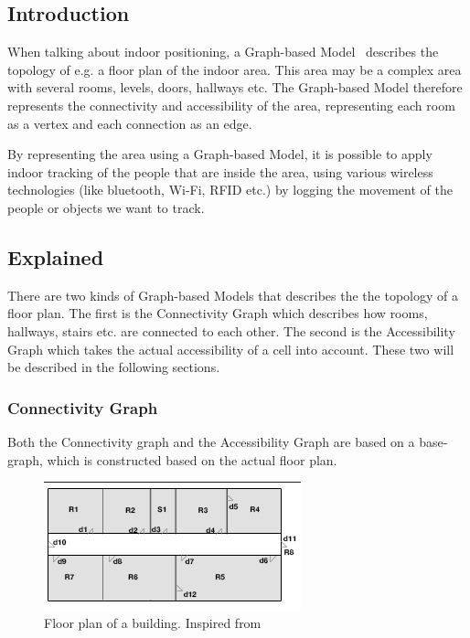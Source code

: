\subsection{Introduction}
When talking about indoor positioning, a Graph-based Model~\cite{Jensen:2009:GMB:1590953.1591000} describes the topology of e.g. a floor plan of the indoor area. 
This area may be a complex area with several rooms, levels, doors, hallways etc. 
The Graph-based Model therefore represents the connectivity and accessibility of the area, representing each room as a vertex and each connection as an edge. 

By representing the area using a Graph-based Model, it is possible to apply indoor tracking of the people that are inside the area, using various wireless technologies (like bluetooth, Wi-Fi, RFID etc.) by logging the movement of the people or objects we want to track.


\subsection{Explained}
There are two kinds of Graph-based Models that describes the the topology of a floor plan. 
The first is the Connectivity Graph which describes how rooms, hallways, stairs etc. are connected to each other. 
The second is the Accessibility Graph which takes the actual accessibility of a cell into account. 
These two will be described in the following sections. 


\subsubsection{ \quad Connectivity Graph}
Both the Connectivity graph and the Accessibility Graph are based on a base-graph, which is constructed based on the actual floor plan. 

\begin{figure}[H]%
\includegraphics{images/floorplan.png}%
\caption{Floor plan of a building. Inspired from~\cite{Jensen:2009:GMB:1590953.1591000}}%
\label{fig:floortplan}%
\end{figure}%

